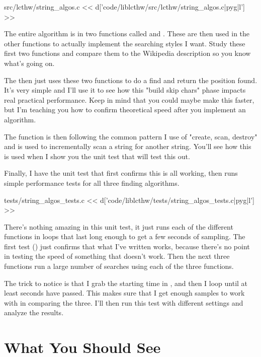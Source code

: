 \begin{code}{src/lcthw/string\_algos.c}
<< d['code/liblcthw/src/lcthw/string_algos.c|pyg|l'] >>
\end{code}

The entire algorithm is in two  functions called
 and .  These are
then used in the other functions to actually implement the searching styles I
want.  Study these first two functions and compare them to the Wikipedia
description so you know what's going on.

The  then just uses these two functions to do a find and
return the position found.  It's very simple and I'll use it to see how this
"build skip chars" phase impacts real practical performance.  Keep in mind that
you could maybe make this faster, but I'm teaching you how to confirm
theoretical speed after you implement an algorithm.

The  function is then following the common pattern I
use of "create, scan, destroy" and is used to incrementally scan a string for
another string.  You'll see how this is used when I show you the unit test that
will test this out.

Finally, I have the unit test that first confirms this is all working, then
runs simple performance tests for all three finding algorithms.

\begin{code}{tests/string\_algos\_tests.c}
<< d['code/liblcthw/tests/string_algos_tests.c|pyg|l'] >>
\end{code}

There's nothing amazing in this unit test, it just runs each of the different
functions in loops that last long enough to get a few seconds of sampling.  The
first test () just confirms that what I've written
works, because there's no point in testing the speed of something that doesn't
work.  Then the next three functions run a large number of searches using each
of the three functions.

The trick to notice is that I grab the starting time in , and then
I loop until at least  seconds have passed.  This makes sure
that I get enough samples to work with in comparing the three.  I'll then run
this test with different  settings and analyze the results.

\section{What You Should See}

